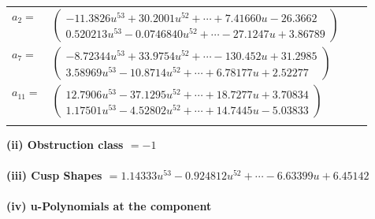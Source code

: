 \documentclass[1p]{elsarticle_modified}
\theoremstyle{definition}
\begin{document}
\begin{tabular}{m{7pt} m{180pt} m{7pt} m{180pt} }
\flushright $a_{2}=$&$\begin{pmatrix}-11.3826 u^{53}+30.2001 u^{52}+\cdots+7.41660 u-26.3662\\0.520213 u^{53}-0.0746840 u^{52}+\cdots-27.1247 u+3.86789\end{pmatrix}$ \\
\flushright $a_{7}=$&$\begin{pmatrix}-8.72344 u^{53}+33.9754 u^{52}+\cdots-130.452 u+31.2985\\3.58969 u^{53}-10.8714 u^{52}+\cdots+6.78177 u+2.52277\end{pmatrix}$ \\
\flushright $a_{11}=$&$\begin{pmatrix}12.7906 u^{53}-37.1295 u^{52}+\cdots+18.7277 u+3.70834\\1.17501 u^{53}-4.52802 u^{52}+\cdots+14.7445 u-5.03833\end{pmatrix}$\\&\end{tabular}
\flushleft \textbf{(ii) Obstruction class $= -1$}\\~\\
\flushleft \textbf{(iii) Cusp Shapes $= 1.14333 u^{53}-0.924812 u^{52}+\cdots-6.63399 u+6.45142$}\\~\\
\newpage\renewcommand{\arraystretch}{1}
\flushleft \textbf{(iv) u-Polynomials at the component}\newline \\
\end{document}
